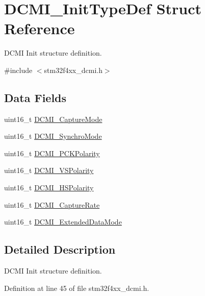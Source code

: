 \hypertarget{struct_d_c_m_i___init_type_def}{\section{D\-C\-M\-I\-\_\-\-Init\-Type\-Def Struct Reference}
\label{struct_d_c_m_i___init_type_def}
}


D\-C\-M\-I Init structure definition.  




{\ttfamily \#include $<$stm32f4xx\-\_\-dcmi.\-h$>$}

\subsection*{Data Fields}
\begin{DoxyCompactItemize}
\item 
uint16\-\_\-t \hyperlink{struct_d_c_m_i___init_type_def_ad37548d24059a28369becd70badb3540}{D\-C\-M\-I\-\_\-\-Capture\-Mode}
\item 
uint16\-\_\-t \hyperlink{struct_d_c_m_i___init_type_def_a8028aed76d7b153d217f06f3545c6e5a}{D\-C\-M\-I\-\_\-\-Synchro\-Mode}
\item 
uint16\-\_\-t \hyperlink{struct_d_c_m_i___init_type_def_a5b8b15115122759a1aca13b0894d1aad}{D\-C\-M\-I\-\_\-\-P\-C\-K\-Polarity}
\item 
uint16\-\_\-t \hyperlink{struct_d_c_m_i___init_type_def_ad72fd224d329072bd402fbf0b4136ce5}{D\-C\-M\-I\-\_\-\-V\-S\-Polarity}
\item 
uint16\-\_\-t \hyperlink{struct_d_c_m_i___init_type_def_a4da83634b419ef959b40963b659df5e7}{D\-C\-M\-I\-\_\-\-H\-S\-Polarity}
\item 
uint16\-\_\-t \hyperlink{struct_d_c_m_i___init_type_def_ac1e426f5f2fec2eff411c37230f2d6c5}{D\-C\-M\-I\-\_\-\-Capture\-Rate}
\item 
uint16\-\_\-t \hyperlink{struct_d_c_m_i___init_type_def_a42738931f709ed4db0864708515da3ad}{D\-C\-M\-I\-\_\-\-Extended\-Data\-Mode}
\end{DoxyCompactItemize}


\subsection{Detailed Description}
D\-C\-M\-I Init structure definition. 

Definition at line 45 of file stm32f4xx\-\_\-dcmi.\-h.




